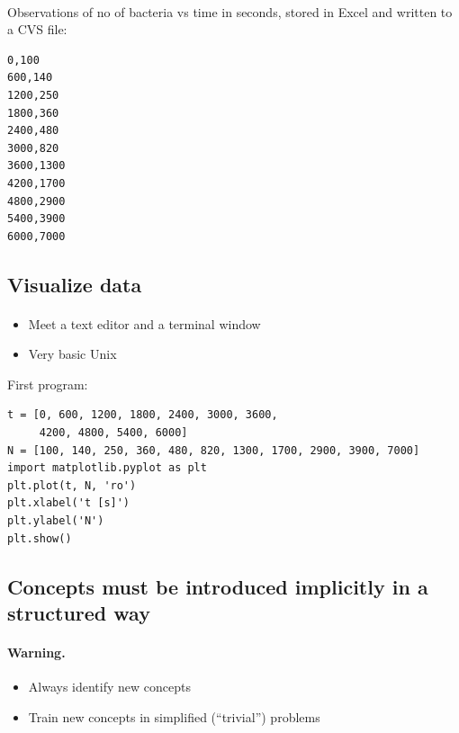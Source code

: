 \documentclass[%
twoside,                 %
final,                   %
10pt]{article}
\begin{document}
\paragraph{}
Observations of no of bacteria vs time in seconds,
stored in Excel and written to a CVS file:

\begin{verbatim}
0,100
600,140
1200,250
1800,360
2400,480
3000,820
3600,1300
4200,1700
4800,2900
5400,3900
6000,7000
\end{verbatim}



\subsection*{Visualize data}


\paragraph{}
\begin{itemize}
 \item Meet a text editor and a terminal window

 \item Very basic Unix
\end{itemize}

\noindent
First program:

\begin{verbatim}
t = [0, 600, 1200, 1800, 2400, 3000, 3600,
     4200, 4800, 5400, 6000]
N = [100, 140, 250, 360, 480, 820, 1300, 1700, 2900, 3900, 7000]
import matplotlib.pyplot as plt
plt.plot(t, N, 'ro')
plt.xlabel('t [s]')
plt.ylabel('N')
plt.show()
\end{verbatim}




\subsection*{Concepts must be introduced implicitly in a structured way}


\paragraph{Warning.}
\begin{itemize}
 \item Always identify new concepts

 \item Train new concepts in simplified (``trivial'') problems
\end{itemize}
\end{document}
